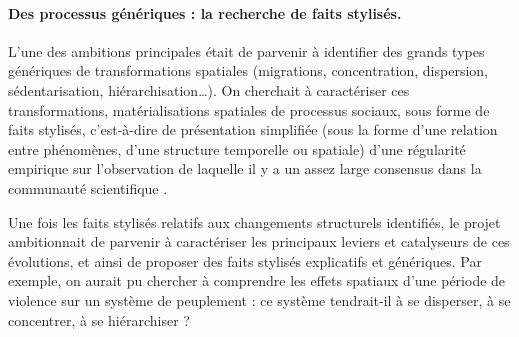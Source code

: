 \paragraph{Des processus génériques : la recherche de faits stylisés.}

L'une des ambitions principales était de parvenir à identifier des grands types génériques de transformations spatiales (migrations, concentration, dispersion, sédentarisation, hiérarchisation\ldots).
On cherchait à caractériser ces transformations, matérialisations spatiales de processus sociaux, sous forme de \og faits stylisés\fg{}, c'est-à-dire de \og présentation simplifiée (sous la forme d’une relation entre phénomènes, d’une structure temporelle ou spatiale) d’une régularité empirique sur l’observation de laquelle il y a un assez large consensus dans la communauté scientifique\fg{} \autocite[70]{nuninger_cadre_2017}.

Une fois les faits stylisés relatifs aux changements structurels identifiés, le projet ambitionnait de parvenir à caractériser les principaux leviers et catalyseurs de ces évolutions, et ainsi de proposer des faits stylisés explicatifs et génériques.
Par exemple, on aurait pu chercher à comprendre les effets spatiaux d'une période de violence sur un système de peuplement : ce système tendrait-il à se disperser, à se concentrer, à se hiérarchiser ?


